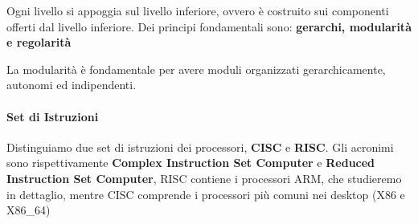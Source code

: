 Ogni livello si appoggia sul livello inferiore, ovvero è costruito sui componenti offerti dal livello inferiore. Dei principi fondamentali sono: \textbf{gerarchi, modularità e regolarità}

La modularità è fondamentale per avere moduli organizzati gerarchicamente, autonomi ed indipendenti.

\paragraph{Set di Istruzioni}

Distinguiamo due set di istruzioni dei processori, \textbf{CISC} e \textbf{RISC}. Gli acronimi sono rispettivamente \textbf{Complex Instruction Set Computer} e \textbf{Reduced Instruction Set Computer}, RISC contiene i processori ARM, che studieremo in dettaglio, mentre CISC comprende i processori più comuni nei desktop (X86 e X86\_64)


